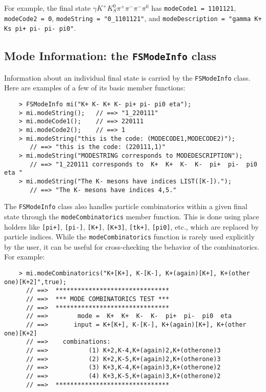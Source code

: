 \documentclass[11pt]{article}
\begin{document}
For example, the final state $\gamma K^+ K^0_S \pi^+ \pi^- \pi^- \pi^0$ has {\tt modeCode1 = 1101121}, {\tt modeCode2 = 0}, {\tt modeString = "0\_1101121"}, and {\tt modeDescription = "gamma K+ Ks pi+ pi- pi- pi0"}. 

\subsection{Mode Information: the {\tt FSModeInfo} class}
\label{sec:modeinfo}

Information about an individual final state is carried by the {\tt FSModeInfo} class.  Here are examples of a few of its basic member functions:
\begin{verbatim}
    > FSModeInfo mi("K+ K- K+ K- pi+ pi- pi0 eta");
    > mi.modeString();   // ==> "1_220111"
    > mi.modeCode1();    // ==> 220111
    > mi.modeCode2();    // ==> 1
    > mi.modeString("this is the code: (MODECODE1,MODECODE2)");
       // ==> "this is the code: (220111,1)" 
    > mi.modeString("MODESTRING corresponds to MODEDESCRIPTION");
       // ==> "1_220111 corresponds to  K+  K+  K-  K-  pi+  pi-  pi0  eta "
    > mi.modeString("The K- mesons have indices LIST([K-]).");
       // ==> "The K- mesons have indices 4,5."
\end{verbatim}

The {\tt FSModeInfo} class also handles particle combinatorics within a given final state through the {\tt modeCombinatorics} member function.  This is done using place holders like {\tt [pi+]}, {\tt [pi-]}, {\tt [K+]}, {\tt [K+3]}, {\tt [tk+]}, {\tt [pi0]}, etc., which are replaced by particle indices.  While the {\tt modeCombinatorics} function is rarely used explicitly by the user, it can be useful for cross-checking the behavior of the combinatorics. For example:
\begin{verbatim}
    > mi.modeCombinatorics("K+[K+], K-[K-], K+(again)[K+], K+(other one)[K+2]",true);
      // ==>  *******************************
      // ==>  *** MODE COMBINATORICS TEST ***
      // ==>  *******************************
      // ==>        mode =  K+  K+  K-  K-  pi+  pi-  pi0  eta 
      // ==>       input = K+[K+], K-[K-], K+(again)[K+], K+(other one)[K+2]
      // ==>    combinations:
      // ==>           (1) K+2,K-4,K+(again)2,K+(otherone)3
      // ==>           (2) K+2,K-5,K+(again)2,K+(otherone)3
      // ==>           (3) K+3,K-4,K+(again)3,K+(otherone)2
      // ==>           (4) K+3,K-5,K+(again)3,K+(otherone)2
      // ==>  *******************************
\end{verbatim}
\end{document}
